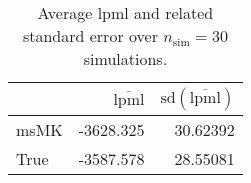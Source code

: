 \begin{table}[H]

\caption{Average lpml and related standard error over $n_{\text{sim}} = 30$ simulations.}
\centering
\begin{tabular}[t]{lrr}
\toprule
  & $\overbar{\text{lpml}}$ & $\text{sd}(\overbar{\text{lpml}})$\\
\midrule
msMK & -3628.325 & 30.62392\\
True & -3587.578 & 28.55081\\
\bottomrule
\end{tabular}
\end{table}